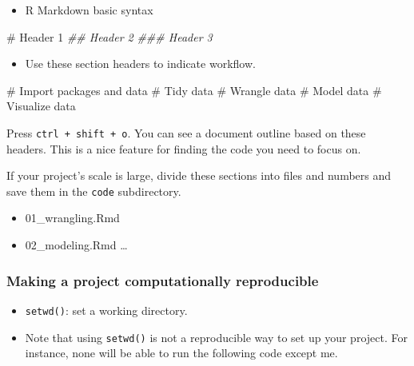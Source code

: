 \documentclass[
  letterpaper,
  DIV=11,
  numbers=noendperiod]{scrreprt}
\newenvironment{Shaded}{\begin{snugshade}}{\end{snugshade}}
\newcommand{\CommentTok}[1]{\textcolor[rgb]{0.37,0.37,0.37}{#1}}
\newcommand{\DocumentationTok}[1]{\textcolor[rgb]{0.37,0.37,0.37}{\textit{#1}}}
\providecommand{\tightlist}{%
  \setlength{\itemsep}{0pt}\setlength{\parskip}{0pt}}\usepackage{longtable,booktabs,array}
\begin{document}
\begin{itemize}
\tightlist
\item
  R Markdown basic syntax
\end{itemize}

\begin{Shaded}
\begin{Highlighting}[]
\CommentTok{\# Header 1}
\DocumentationTok{\#\# Header 2}
\DocumentationTok{\#\#\# Header 3}
\end{Highlighting}
\end{Shaded}

\begin{itemize}
\tightlist
\item
  Use these section headers to indicate workflow.
\end{itemize}

\begin{Shaded}
\begin{Highlighting}[]
\CommentTok{\# Import packages and data}
\CommentTok{\# Tidy data}
\CommentTok{\# Wrangle data}
\CommentTok{\# Model data}
\CommentTok{\# Visualize data}
\end{Highlighting}
\end{Shaded}

Press \texttt{ctrl\ +\ shift\ +\ o}. You can see a document outline
based on these headers. This is a nice feature for finding the code you
need to focus on.

If your project's scale is large, divide these sections into files and
numbers and save them in the \texttt{code} subdirectory.

\begin{itemize}
\tightlist
\item
  01\_wrangling.Rmd
\item
  02\_modeling.Rmd \ldots{}
\end{itemize}

\hypertarget{making-a-project-computationally-reproducible}{%
\subsubsection*{Making a project computationally
reproducible}\label{making-a-project-computationally-reproducible}}

\begin{itemize}
\item
  \texttt{setwd()}: set a working directory.
\item
  Note that using \texttt{setwd()} is not a reproducible way to set up
  your project. For instance, none will be able to run the following
  code except me.
\end{itemize}
\end{document}
